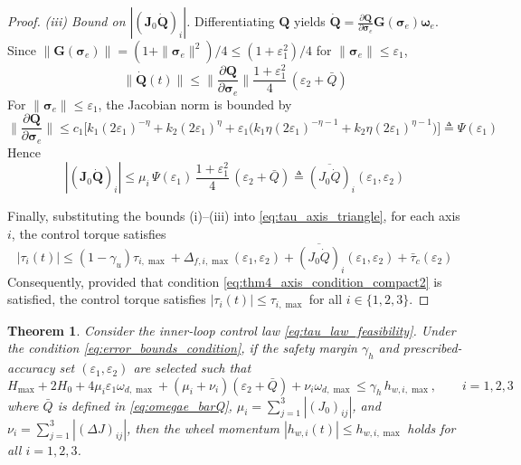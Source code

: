 \documentclass[journal]{new-aiaa}
\newtheorem{theorem}{Theorem}
\begin{document}
\begin{proof}
\emph{(iii) Bound on $|(\boldsymbol{J}_0\dot{\boldsymbol{Q}})_i|$.}
Differentiating $\boldsymbol{Q}$ yields
$\dot{\boldsymbol{Q}} = \frac{\partial\boldsymbol{Q}}{\partial\boldsymbol{\sigma}_e}\boldsymbol{G}(\boldsymbol{\sigma}_e)\boldsymbol{\omega}_e$.
Since $\|\boldsymbol{G}(\boldsymbol{\sigma}_e)\| = (1+\|\boldsymbol{\sigma}_e\|^2)/4 \le (1+\varepsilon_1^2)/4$ for $\|\boldsymbol{\sigma}_e\|\le\varepsilon_1$,
\begin{equation}
\|\dot{\boldsymbol{Q}}(t)\|
\le \Big\|\frac{\partial\boldsymbol{Q}}{\partial\boldsymbol{\sigma}_e}\Big\|
\frac{1+\varepsilon_1^2}{4}\,(\varepsilon_2+\bar Q)
\end{equation}
For $\|\boldsymbol{\sigma}_e\|\le\varepsilon_1$, the Jacobian norm is bounded by
\begin{equation}
\Big\|\frac{\partial\boldsymbol{Q}}{\partial\boldsymbol{\sigma}_e}\Big\|
\le c_1\Big[k_1(2\varepsilon_1)^{-\eta} + k_2(2\varepsilon_1)^{\eta}
+ \varepsilon_1\big(k_1\eta(2\varepsilon_1)^{-\eta-1} + k_2\eta(2\varepsilon_1)^{\eta-1}\big)\Big]
\triangleq \Psi(\varepsilon_1)
\label{eq:Psi_def_thm4}
\end{equation}
Hence
\begin{equation}
|(\boldsymbol{J}_0\dot{\boldsymbol{Q}})_i|
\le \mu_i\,\Psi(\varepsilon_1)\,\frac{1+\varepsilon_1^2}{4}\,(\varepsilon_2+\bar Q)
\triangleq \overline{(J_0\dot Q)}_i(\varepsilon_1,\varepsilon_2)
\label{eq:thm4_JQdot_bar_compact2}
\end{equation}

Finally, substituting the bounds (i)--(iii) into \eqref{eq:tau_axis_triangle}, for each axis $i$, the control torque satisfies
\[
|\tau_i(t)|
\le (1-\gamma_u)\tau_{i,\max}
+\Delta_{f,i,\max}(\varepsilon_1,\varepsilon_2)
+\overline{(J_0\dot Q)}_i(\varepsilon_1,\varepsilon_2)
+\bar\tau_c(\varepsilon_2)
\]
Consequently, provided that condition \eqref{eq:thm4_axis_condition_compact2} is satisfied, 
the control torque satisfies $|\tau_i(t)| \le \tau_{i,\max}$ for all $i \in \{1,2,3\}$.
\end{proof}

\begin{theorem}
\label{thm:feasibility_momentum}
Consider the inner-loop control law \eqref{eq:tau_law_feasibility}. Under the condition \eqref{eq:error_bounds_condition}, 
if the safety margin $\gamma_h$ and prescribed-accuracy set $(\varepsilon_1,\varepsilon_2)$ are selected such that
\begin{equation}
H_{\max} + 2H_0 + 4\mu_i\varepsilon_1\omega_{d,\max} + (\mu_i + \nu_i) (\varepsilon_2 + \bar Q) + \nu_i \omega_{d,\max}\le \gamma_h\, h_{w,i,\max},\qquad i=1,2,3
\label{eq:thm5_axis_condition}
\end{equation}
where $\bar Q$ is defined in \eqref{eq:omegae_barQ}, $\mu_i = \sum_{j=1}^{3}|(J_0)_{ij}|$, and $\nu_i = \sum_{j=1}^{3}|(\Delta J)_{ij}|$,
then the wheel momentum $|h_{w,i}(t)|\le h_{w,i,\max}$ holds for all $i=1,2,3$.
\end{theorem}
\end{document}
